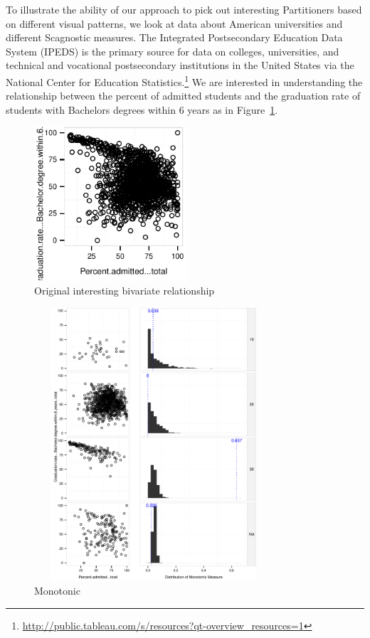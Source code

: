 To illustrate the ability of our approach to pick out interesting Partitioners based on different visual patterns, we look at data about American universities and different Scagnostic measures. The Integrated Postsecondary Education Data System (IPEDS) is the primary source for data on colleges, universities, and technical and vocational postsecondary institutions in the United States via the National Center for Education Statistics.\footnote{\url{http://public.tableau.com/s/resources?qt-overview_resources=1}} We are interested in understanding the relationship between the percent of admitted students and the graduation rate of students with Bachelors degrees within $6$ years as in Figure~\ref{fig:original1}. 
\begin{figure}
 \centering 
\includegraphics[width=2.25in,height=2.25in]{images/Percent_admitted_total-Graduation_rate_Bachelor_degree_within_6_years_total.pdf}
  \caption{Original interesting bivariate relationship}
 \label{fig:original1}
\end{figure}

\begin{figure}
\includegraphics[width=3.5in,height=4in]{images/24_6604273087972-ACT_Composite_75th_percentile_score_bin.pdf}
  \caption{Monotonic}
 \label{fig:monotonic1}
\end{figure}

